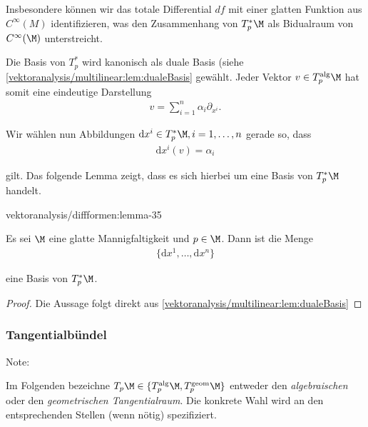 \documentclass[letterpaper,10pt,english]{jupyterBook}
\begin{document}
\par
Insbesondere können wir das totale Differential \(df\) mit einer glatten Funktion aus \(C^\infty(M)\) identifizieren, was den Zusammenhang von \(T^\ast_p \M\) als Bidualraum von \(C^\infty(\M)\) unterstreicht.

\par
Die Basis von \(T^\ast_p\) wird kanonisch als duale Basis (siehe \cref{vektoranalysis/multilinear:lem:dualeBasis}  gewählt.
Jeder Vektor \(v\in T_p^{\text{alg}}\M\) hat somit eine eindeutige Darstellung
\begin{align*}
v = \sum_{i=1}^n \alpha_i \partial_{x^i}.
\end{align*}
\par
Wir wählen nun Abbildungen \(\mathrm{d}x^i\in T^\ast_p\M, i=1,\ldots,n\) gerade so, dass
\begin{align*}
\mathrm{d}x^i(v) = \alpha_i
\end{align*}
\par
gilt.
Das folgende Lemma zeigt, dass es sich hierbei um eine Basis von \(T^\ast_p\M\) handelt.
\begin{lemma}{}{vektoranalysis/diffformen:lemma-35}



\par
Es sei \(\M\) eine glatte Mannigfaltigkeit und \(p\in\M\).
Dann ist die Menge
\begin{align*}
\{\mathrm{d}x^1,\ldots, \mathrm{d}x^n\}
\end{align*}
\par
eine Basis von \(T_p^\ast\M\).
\end{lemma}

\begin{proof}
 Die Aussage folgt direkt aus \cref{vektoranalysis/multilinear:lem:dualeBasis} 
\end{proof}


\subsubsection{Tangentialbündel}
\label{\detokenize{vektoranalysis/diffformen:tangentialbundel}}
\begin{emphBox}{}{}{Note:}
\par
Im Folgenden bezeichne \(T_p\M\in\{T^{\text{alg}}_p\M, T^{\text{geom}}_p\M \}\) entweder den \emph{algebraischen} oder den \emph{geometrischen Tangentialraum}.
Die konkrete Wahl wird an den entsprechenden Stellen (wenn nötig) spezifiziert.
\end{emphBox}
\end{document}
